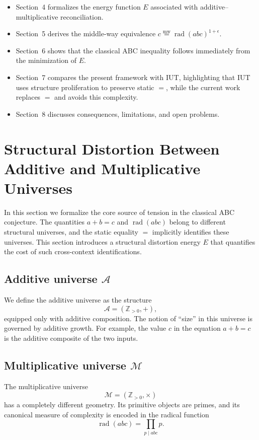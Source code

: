 \documentclass[11pt]{article}
\newcommand{\mweq}{\mathrel{\overset{\mathrm{mw}}{=}}}
\theoremstyle{definition}
\theoremstyle{remark}
\begin{document}
\begin{itemize}
  \item Section~4 formalizes the energy function $E$ associated with
        additive--multiplicative reconciliation.
  \item Section~5 derives the middle-way equivalence
        $c \mweq \operatorname{rad}(abc)^{1+\epsilon}$.
  \item Section~6 shows that the classical ABC inequality follows
        immediately from the minimization of $E$.
  \item Section~7 compares the present framework with IUT, highlighting
        that IUT uses structure proliferation to preserve static $=$,
        while the current work replaces $=$ and avoids this complexity.
  \item Section~8 discusses consequences, limitations, and open problems.
\end{itemize}


\section{Structural Distortion Between Additive and Multiplicative Universes}

In this section we formalize the core source of tension in the classical
ABC conjecture. The quantities $a+b=c$ and $\operatorname{rad}(abc)$
belong to different structural universes, and the static equality $=$
implicitly identifies these universes. This section introduces a
structural distortion energy $E$ that quantifies the cost of such
cross-context identifications.

\subsection{Additive universe $\mathcal{A}$}

We define the additive universe as the structure
\[
  \mathcal{A} = (\mathbb{Z}_{>0}, +),
\]
equipped only with additive composition. The notion of ``size'' in this
universe is governed by additive growth. For example, the value $c$ in
the equation $a+b=c$ is the additive composite of the two inputs.

\subsection{Multiplicative universe $\mathcal{M}$}

The multiplicative universe
\[
  \mathcal{M} = (\mathbb{Z}_{>0}, \times)
\]
has a completely different geometry. Its primitive objects are primes,
and its canonical measure of complexity is encoded in the radical
function
\[
  \operatorname{rad}(abc)
    = \prod_{p \mid abc} p.
\]
\end{document}
